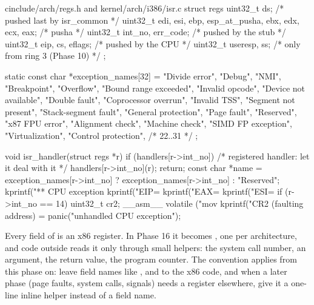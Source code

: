 \documentclass[11pt,a4paper]{article}
\begin{document}
\begin{lst}{c}{include/arch/regs.h and kernel/arch/i386/isr.c}
struct regs {
    uint32_t ds;                                        /* pushed last by isr_common */
    uint32_t edi, esi, ebp, esp_at_pusha, ebx, edx, ecx, eax;   /* pusha */
    uint32_t int_no, err_code;                          /* pushed by the stub        */
    uint32_t eip, cs, eflags;                           /* pushed by the CPU         */
    uint32_t useresp, ss;                               /* only from ring 3 (Phase 10) */
};

static const char *exception_names[32] = {
    "Divide error", "Debug", "NMI", "Breakpoint", "Overflow", "Bound range exceeded",
    "Invalid opcode", "Device not available", "Double fault", "Coprocessor overrun",
    "Invalid TSS", "Segment not present", "Stack-segment fault", "General protection",
    "Page fault", "Reserved", "x87 FPU error", "Alignment check", "Machine check",
    "SIMD FP exception", "Virtualization", "Control protection", /* 22..31 */ };

void isr_handler(struct regs *r)
{
    if (handlers[r->int_no]) {              /* registered handler: let it deal with it */
        handlers[r->int_no](r);
        return;
    }
    const char *name = exception_names[r->int_no] ? exception_names[r->int_no] : "Reserved";
    kprintf("\n*** CPU exception %
    kprintf("EIP=%
    kprintf("EAX=%
    kprintf("ESI=%
    if (r->int_no == 14) {
        uint32_t cr2;
        __asm__ volatile ("mov %
        kprintf("CR2 (faulting address) = %
    }
    panic("unhandled CPU exception");
}
\end{lst}

\begin{tipbox}
Every field of  is an x86 register. In Phase 16 it becomes , one per
architecture, and code outside  reads it only through small helpers: the system call number,
an argument, the return value, the program counter. The convention applies from this phase on: leave field names like ,
 and  to the x86 code, and when a later phase (page faults, system calls, signals) needs a
register elsewhere, give it a one-line inline helper instead of a field name.
\end{tipbox}
\end{document}
